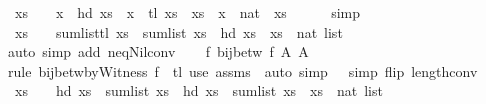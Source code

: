 \begin{isabellebody}
\ {}{\isacharcolon}{\kern0pt}\ {\isachardoublequoteopen}xs\ {\isasymnoteq}\ {\isacharbrackleft}{\kern0pt}{\isacharbrackright}{\kern0pt}\ {\isasymLongrightarrow}\ x\ {\isacharequal}{\kern0pt}\ hd\ xs\ {\isasymLongrightarrow}\ x\ {\isacharhash}{\kern0pt}\ tl\ xs\ {\isacharequal}{\kern0pt}\ xs{\isachardoublequoteclose}\ \ x\ {\isacharcolon}{\kern0pt}{\isacharcolon}{\kern0pt}\ nat\ \ xs\isanewline
\ \ \ \ \isamarkupfalse%
\ simp\isanewline
\ \ \isamarkupfalse%
\ {}{\isacharcolon}{\kern0pt}\ {\isachardoublequoteopen}xs\ {\isasymnoteq}\ {\isacharbrackleft}{\kern0pt}{\isacharbrackright}{\kern0pt}\ {\isasymLongrightarrow}\ sum{\isacharunderscore}{\kern0pt}list{\isacharparenleft}{\kern0pt}tl\ xs{\isacharparenright}{\kern0pt}\ {\isacharequal}{\kern0pt}\ sum{\isacharunderscore}{\kern0pt}list\ xs\ {\isacharminus}{\kern0pt}\ hd\ xs{\isachardoublequoteclose}\ \ xs\ {\isacharcolon}{\kern0pt}{\isacharcolon}{\kern0pt}\ {\isachardoublequoteopen}nat\ list{\isachardoublequoteclose}\isanewline
\ \ \ \ \isamarkupfalse%
\ {\isacharparenleft}{\kern0pt}auto\ simp\ add{\isacharcolon}{\kern0pt}\ neq{\isacharunderscore}{\kern0pt}Nil{\isacharunderscore}{\kern0pt}conv{\isacharparenright}{\kern0pt}\isanewline
\ \ \isamarkupfalse%
\ f{\isacharcolon}{\kern0pt}\ {\isachardoublequoteopen}bij{\isacharunderscore}{\kern0pt}betw\ {\isacharquery}{\kern0pt}f\ {\isacharquery}{\kern0pt}A\ {\isacharquery}{\kern0pt}A{\isacharprime}{\kern0pt}{\isachardoublequoteclose}\isanewline
\ \ \ \ \isamarkupfalse%
\ {\isacharparenleft}{\kern0pt}rule\ bij{\isacharunderscore}{\kern0pt}betw{\isacharunderscore}{\kern0pt}byWitness{\isacharbrackleft}{\kern0pt}\ f{\isacharprime}{\kern0pt}\ {\isacharequal}{\kern0pt}\ tl{\isacharbrackright}{\kern0pt}{\isacharparenright}{\kern0pt}\ {\isacharparenleft}{\kern0pt}use\ assms\ \ {\isacartoucheopen}auto\ simp{\isacharcolon}{\kern0pt}\ {}\ {}\ simp\ flip{\isacharcolon}{\kern0pt}\ length{\isacharunderscore}{\kern0pt}{}{\isacharunderscore}{\kern0pt}conv{\isacartoucheclose}{\isacharparenright}{\kern0pt}\isanewline
\ \ \isamarkupfalse%
\ {}{\isacharcolon}{\kern0pt}\ {\isachardoublequoteopen}xs\ {\isasymnoteq}\ {\isacharbrackleft}{\kern0pt}{\isacharbrackright}{\kern0pt}\ {\isasymLongrightarrow}\ hd\ xs\ {\isacharplus}{\kern0pt}\ {\isacharparenleft}{\kern0pt}sum{\isacharunderscore}{\kern0pt}list\ xs\ {\isacharminus}{\kern0pt}\ hd\ xs{\isacharparenright}{\kern0pt}\ {\isacharequal}{\kern0pt}\ sum{\isacharunderscore}{\kern0pt}list\ xs{\isachardoublequoteclose}\ \ xs\ {\isacharcolon}{\kern0pt}{\isacharcolon}{\kern0pt}\ {\isachardoublequoteopen}nat\ list{\isachardoublequoteclose}\isanewline

\end{isabellebody}
